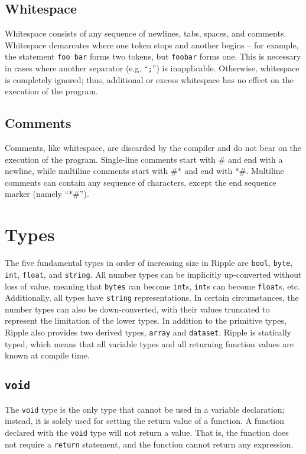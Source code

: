 \documentclass{article}
\newcommand{\code}{\texttt}
\begin{document}
\subsection{Whitespace}
Whitespace consists of any sequence of newlines, tabs, spaces, and comments. Whitespace demarcates where one token stops and another begins -- for example, the statement \code{foo bar} forms two tokens, but \code{foobar} forms one. This is necessary in cases where another separator (e.g. ``\code{;}'') is inapplicable. Otherwise, whitespace is completely ignored; thus, additional or excess whitespace has no effect on the execution of the program.

\subsection{Comments}
Comments, like whitespace, are discarded by the compiler and do not bear on the execution of the program. Single-line comments start with $\code{\#}$ and end with a newline, while multiline comments start with $\code{\#*}$ and end with $\code{*\#}$. Multiline comments can contain any sequence of characters, except the end sequence marker (namely ``$\code{*\#}$'').

\section{Types}
The five fundamental types in order of increasing size in Ripple are \code{bool}, \code{byte}, \code{int}, \code{float}, and  \code{string}. All number types can be implicitly up-converted without loss of value, meaning that \code{bytes} can become \code{int}s, \code{int}s can become \code{float}s, etc. Additionally, all types have \code{string} representations. In certain circumstances, the number types can also be down-converted, with their values truncated to represent the limitation of the lower types. In addition to the primitive types, Ripple also provides two derived types, \code{array} and \code{dataset}. Ripple is statically typed, which means that all variable types and all returning function values are known at compile time. 

\subsection{\code{void}}
The \code{void} type is the only type that cannot be used in a variable declaration; instead, it is solely used for setting the return value of a function. A function declared with the \code{void} type will not return a value. That is, the function does not require a \code{return} statement, and the function cannot return any expression.
\end{document}
